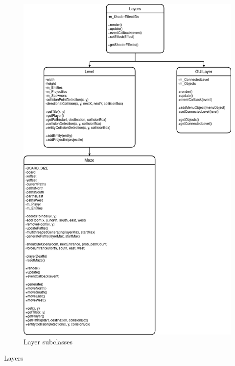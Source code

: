 \documentclass[../../Main.tex]{subfiles}
\begin{document}
    \begin{figure}[hbt!]
        \centerline{\includegraphics[scale=0.5]{img/Classes/Layers.png}}
        \caption{Layer subclasses}
        \label{fig}
    \end{figure}
    Layers
\end{document}
